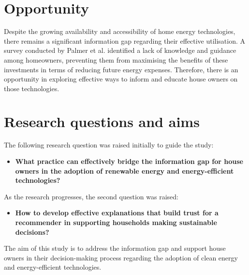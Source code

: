 \section{Opportunity}

Despite the growing availability and accessibility of home energy technologies, there remains a significant information gap regarding their effective utilisation. 
A survey conducted by Palmer et al. \cite{informationgap} identified a lack of knowledge and guidance among homeowners, preventing them from maximising the benefits of these investments in terms of reducing future energy expenses. 
Therefore, there is an opportunity in exploring effective ways to inform and educate house owners on those technologies. 


\section{Research questions and aims}

The following research question was raised initially to guide the study: 
\begin{itemize}
  \item \textbf{What practice can effectively bridge the information gap for house owners in the adoption of renewable energy and energy-efficient technologies?}
\end{itemize}

As the research progresses, the second question was raised: 
\begin{itemize}
  \item \textbf{How to develop effective explanations that build trust for a recommender in supporting households making sustainable decisions? }
\end{itemize}

The aim of this study is to address the information gap and support house owners in their decision-making process regarding the adoption of clean energy and energy-efficient technologies. 

